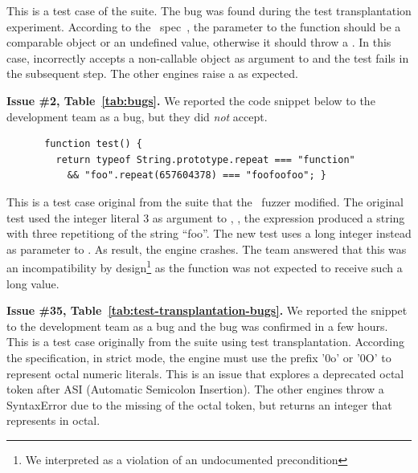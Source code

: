 \documentclass[smallextended]{svjour3}
\begin{document}
This is a test case of the \jerry{} suite. The bug was found during
the test transplantation experiment. According to the
\es\ spec~\cite{ecmas262-array-sort}, the parameter to the
 function should be a comparable object or an
undefined value, otherwise it should throw a . In
this case, \jsc incorrectly accepts a non-callable object as argument
to  and the test fails in the subsequent step. The other
engines raise a  as expected.

\vspace{1ex}\noindent\textbf{Issue \#2, Table~\ref{tab:bugs}.} We
reported the code snippet below to the \textbf{\chakra} development team as a
bug, but they did \emph{not} accept.

\begin{figure}[h!]
  \vspace{-0.5ex}
  \centering
  \scriptsize
  \begin{lstlisting}
 function test() {
   return typeof String.prototype.repeat === "function"
     && "foo".repeat(657604378) === "foofoofoo"; }
  \end{lstlisting}
  \normalsize
  \vspace{-1ex}
\end{figure}


This is a test case original from the \jsc suite that the
\radamsa\ fuzzer modified. The original test used the integer literal
3 as argument to , \ie{}, the expression produced a
string with three repetitiong of the string ``foo''. The new test uses
a long integer instead as parameter to . As result,
the engine crashes. The team answered that this was an incompatibility
by design\footnote{We interpreted as a violation of an undocumented
  precondition} as the function was not expected to receive such a
long value.

\vspace{1ex}\noindent\textbf{Issue \#35, Table~\ref{tab:test-transplantation-bugs}.} We
reported the snippet  to the
\textbf{\smonkey} development team as a bug and the bug was confirmed
in a few hours.  This is a test case originally from the \hermes suite
using test transplantation.  According the specification, in strict
mode, the engine must use the prefix '0o' or '0O' to represent octal
numeric literals. This is an issue that explores a deprecated octal
token after ASI (Automatic Semicolon Insertion). The other engines
throw a SyntaxError due to the missing of the octal token, but \smonkey
returns an integer  that represents  in octal.
\end{document}
